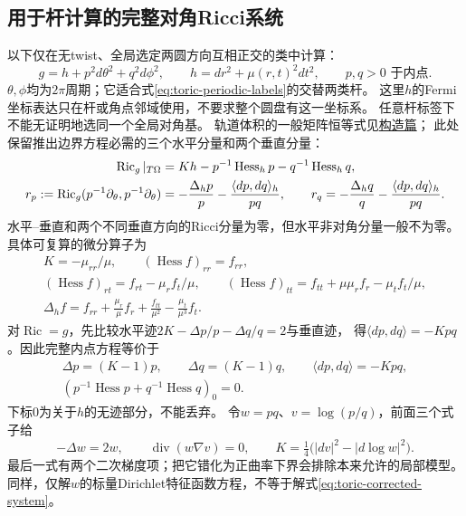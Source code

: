 \documentclass[UTF8,a4paper,11pt,fontset=fandol]{ctexart}
\numberwithin{equation}{section}
\theoremstyle{definition}
\newcommand{\Ric}{\operatorname{Ric}}
\begin{document}
\subsection{用于杆计算的完整对角Ricci系统}
以下仅在无twist、全局选定两圆方向互相正交的类中计算：
\begin{equation}\label{eq:toric-diagonal-metric}
 g=h+p^2d\theta^2+q^2d\phi^2,\qquad
 h=dr^2+\mu(r,t)^2dt^2,\qquad p,q>0\text{ 于内点}.
\end{equation}
$\theta,\phi$均为$2\pi$周期；它适合式\eqref{eq:toric-periodic-labels}的交替两类杆。
这里$h$的Fermi坐标表达只在杆或角点邻域使用，不要求整个圆盘有这一坐标系。
任意杆标签下不能无证明地选同一个全局对角基。
轨道体积的一般矩阵恒等式见\href{20260916_construction.tex}{构造篇}；
此处保留推出边界方程必需的三个水平分量和两个垂直分量：
\begin{align}
 \Ric_g|_{T\Omega}&=Kh-p^{-1}\operatorname{Hess}_h p-q^{-1}\operatorname{Hess}_h q,
 \notag\\
 r_p:=\Ric_g(p^{-1}\partial_\theta,p^{-1}\partial_\theta)
 &=-\frac{\Delta_h p}{p}-\frac{\langle dp,dq\rangle_h}{pq},\qquad
 r_q=-\frac{\Delta_h q}{q}-\frac{\langle dp,dq\rangle_h}{pq}.
 \label{eq:toric-diagonal-Ricci}
\end{align}
水平--垂直和两个不同垂直方向的Ricci分量为零，但水平非对角分量一般不为零。
具体可复算的微分算子为
\begin{equation}\label{eq:toric-Fermi-operators}
 \begin{gathered}
 K=-\mu_{rr}/\mu,\qquad (\operatorname{Hess} f)_{rr}=f_{rr},\\
 (\operatorname{Hess} f)_{rt}=f_{rt}-\mu_r f_t/\mu,\qquad
 (\operatorname{Hess} f)_{tt}=f_{tt}+\mu\mu_r f_r-\mu_t f_t/\mu,\\
 \Delta_h f=f_{rr}+\frac{\mu_r}{\mu}f_r+\frac{f_{tt}}{\mu^2}
             -\frac{\mu_t}{\mu^3}f_t.
 \end{gathered}
\end{equation}
对$\Ric=g$，先比较水平迹$2K-\Delta p/p-\Delta q/q=2$与垂直迹，
得$\langle dp,dq\rangle=-Kpq$。因此完整内点方程等价于
\begin{equation}\label{eq:toric-corrected-system}
 \begin{gathered}
 \Delta p=(K-1)p,\qquad \Delta q=(K-1)q,\qquad
 \langle dp,dq\rangle=-Kpq,\\
 \left(p^{-1}\operatorname{Hess}p+q^{-1}\operatorname{Hess}q\right)_0=0.
 \end{gathered}
\end{equation}
下标0为关于$h$的无迹部分，不能丢弃。
令$w=pq$、$v=\log(p/q)$，前面三个式子给
\begin{equation}\label{eq:toric-w-v}
 -\Delta w=2w,\qquad \operatorname{div}(w\nabla v)=0,\qquad
 K=\tfrac14\bigl(|dv|^2-|d\log w|^2\bigr).
\end{equation}
最后一式有两个二次梯度项；把它错化为正曲率下界会排除本来允许的局部模型。
同样，仅解$w$的标量Dirichlet特征函数方程，不等于解式\eqref{eq:toric-corrected-system}。
\end{document}
